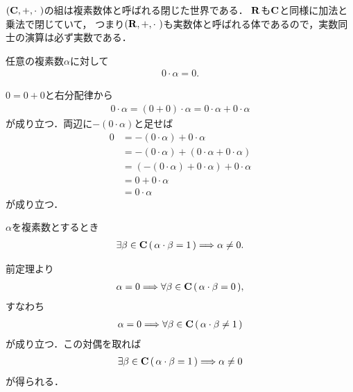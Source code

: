 	$(\C,+,\cdot\ )$の組は複素数体と呼ばれる閉じた世界である．
	$\mathbf{R}$も$\mathbf{C}$と同様に加法と乗法で閉じていて，
	つまり$(\R,+,\cdot\ )$も実数体と呼ばれる体であるので，実数同士の演算は必ず実数である．
	
	\begin{screen}
		\begin{thm}[$0$は乗法に関して逆元を持たない]
		\label{thm:zero_multiplication_is_zero}
			任意の複素数$\alpha$に対して
			\begin{align}
				0 \cdot \alpha = 0.
			\end{align}
		\end{thm}
	\end{screen}
	
	\begin{sketch}
		$0 = 0+0$と右分配律から
		\begin{align}
			0 \cdot \alpha = (0+0) \cdot \alpha
			= 0 \cdot \alpha + 0 \cdot \alpha
		\end{align}
		が成り立つ．両辺に$-(0 \cdot \alpha)$と足せば
		\begin{align}
			0 &= -(0 \cdot \alpha) + 0 \cdot \alpha \\
			&= -(0 \cdot \alpha) + (0 \cdot \alpha + 0 \cdot \alpha) \\
			&= (-(0 \cdot \alpha) + 0 \cdot \alpha) + 0 \cdot \alpha \\
			&= 0 + 0 \cdot \alpha \\
			&= 0 \cdot \alpha
		\end{align}
		が成り立つ．
		\QED
	\end{sketch}
	
	\begin{screen}
		\begin{thm}
		\label{thm:if_has_inverse_wrt_multiplication_then_not_zero}
			$\alpha$を複素数とするとき
			\begin{align}
				\exists \beta \in \mathbf{C}\, (\, \alpha \cdot \beta = 1\, )
				\Longrightarrow \alpha \neq 0.
			\end{align}
		\end{thm}
	\end{screen}
	
	\begin{sketch}
		前定理より
		\begin{align}
			\alpha = 0 \Longrightarrow \forall \beta \in \mathbf{C}\, (\, \alpha \cdot \beta = 0\, ),
		\end{align}
		すなわち
		\begin{align}
			\alpha = 0 \Longrightarrow \forall \beta \in \mathbf{C}\, (\, \alpha \cdot \beta \neq 1\, )
		\end{align}
		が成り立つ．この対偶を取れば
		\begin{align}
			\exists \beta \in \mathbf{C}\, (\, \alpha \cdot \beta = 1\, )
			\Longrightarrow \alpha \neq 0
		\end{align}
		が得られる．
		\QED
	\end{sketch}
	
